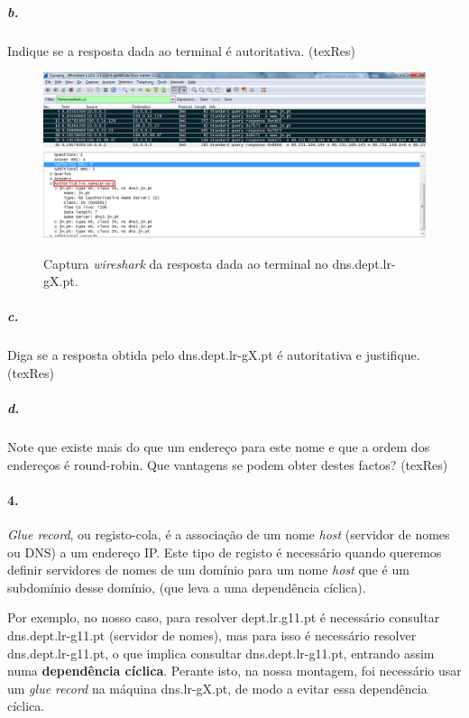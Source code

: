 \subparagraph{b.}
Indique se a resposta dada ao terminal é autoritativa. (texRes)

\begin{figure}[h]
\centering
\includegraphics[width=1\textwidth, height=0.38\textheight]{3b_cap.png}
\label{fig:2-capturaWireshark}
\caption{Captura \emph{wireshark} da resposta dada ao terminal no \textsf{dns.dept.lr-gX.pt}.}
\end{figure}


\subparagraph{c.}
Diga se a resposta obtida pelo dns.dept.lr-gX.pt é autoritativa e justifique. (texRes)


\subparagraph{d.}
Note que existe mais do que um endereço para este nome e que a ordem dos endereços é round-robin. Que vantagens se podem obter destes factos? (texRes)



\paragraph{4.}
\emph{Glue record}, ou registo-cola, é a associação de um nome \emph{host} (servidor de nomes ou DNS) a um endereço IP.
Este tipo de registo é necessário quando queremos definir servidores de nomes de um domínio para um nome \emph{host} que é um subdomínio desse domínio, (que leva a uma dependência cíclica).

Por exemplo, no nosso caso, para resolver \textsf{dept.lr.g11.pt} é necessário consultar \textsf{dns.dept.lr-g11.pt} (servidor de nomes), mas para isso é necessário resolver \textsf{dns.dept.lr-g11.pt}, o que implica consultar \textsf{dns.dept.lr-g11.pt}, entrando assim numa \textbf{dependência cíclica}.
Perante isto, na nossa montagem, foi necessário usar um \emph{glue record} na máquina \textsf{dns.lr-gX.pt}, de modo a evitar essa dependência cíclica.

